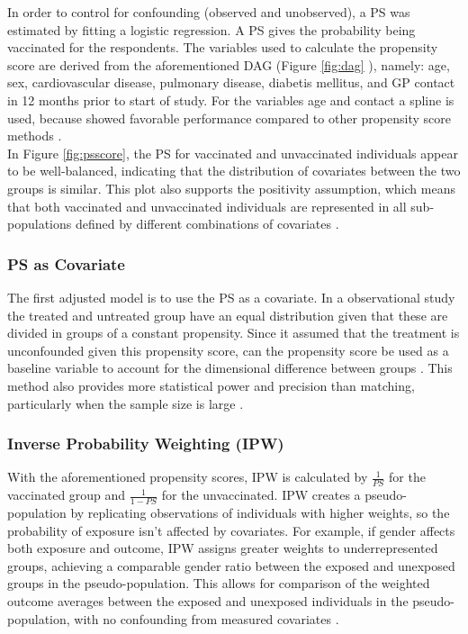 \documentclass[
]{article}
\begin{document}
In order to control for confounding (observed and unobserved), a PS was estimated by fitting a logistic regression. A PS gives the probability being vaccinated for the respondents. The variables used to calculate the propensity score are derived from the aforementioned DAG (Figure \ref{fig:dag} ), namely: age, sex, cardiovascular disease, pulmonary disease, diabetis mellitus, and GP contact in 12 months prior to start of study. For the variables age and contact a spline is used, because showed favorable performance compared to other propensity score methods \citep{Tian}.\\
\hspace*{0.333em}\hspace*{0.333em}\hspace*{0.333em}\hspace*{0.333em}In Figure \ref{fig:psscore}, the PS for vaccinated and unvaccinated individuals appear to be well-balanced, indicating that the distribution of covariates between the two groups is similar. This plot also supports the positivity assumption, which means that both vaccinated and unvaccinated individuals are represented in all sub-populations defined by different combinations of covariates \citep{westreich}.

\hypertarget{ps-as-covariate}{%
\subsubsection{PS as Covariate}\label{ps-as-covariate}}

The first adjusted model is to use the PS as a covariate. In a observational study the treated and untreated group have an equal distribution given that these are divided in groups of a constant propensity. Since it assumed that the treatment is unconfounded given this propensity score, can the propensity score be used as a baseline variable to account for the dimensional difference between groups \citep{schafer}. This method also provides more statistical power and precision than matching, particularly when the sample size is large \citep{austin}.

\hypertarget{inverse-probability-weighting-ipw}{%
\subsubsection{Inverse Probability Weighting (IPW)}\label{inverse-probability-weighting-ipw}}

With the aforementioned propensity scores, IPW is calculated by \(\frac{1}{PS}\) for the vaccinated group and \(\frac{1}{1-PS}\) for the unvaccinated. IPW creates a pseudo-population by replicating observations of individuals with higher weights, so the probability of exposure isn't affected by covariates. For example, if gender affects both exposure and outcome, IPW assigns greater weights to underrepresented groups, achieving a comparable gender ratio between the exposed and unexposed groups in the pseudo-population. This allows for comparison of the weighted outcome averages between the exposed and unexposed individuals in the pseudo-population, with no confounding from measured covariates \citep{shiba}.\\
\end{document}
